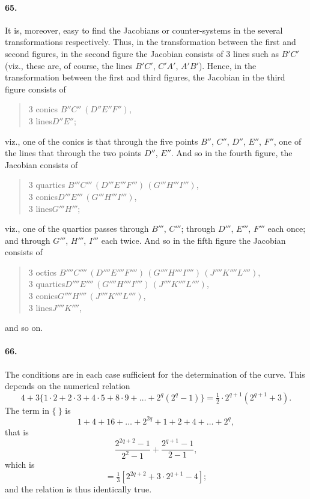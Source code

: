 \documentclass[11pt]{article}
\begin{document}
\paragraph{65.}
It is, moreover, easy to find the Jacobians or counter-systems in the
several transformations respectively. Thus, in the transformation between
the first and second figures, in the second figure the Jacobian consists
of $3$ lines such as $B'C'$ (viz., these are, of course, the lines
$B'C'$, $C'A'$, $A'B'$). Hence, in the transformation between the first
and third figures, the Jacobian in the third figure consists of
\begin{quote}
$3$ conics $B''C''\,(D''E''F'')$,\\
$3$ lines\qquad $D''E''$;
\end{quote}
viz., one of the conics is that through the five points $B''$, $C''$,
$D''$, $E''$, $F''$, one of the lines that through the two points
$D''$, $E''$. And so in the fourth figure, the Jacobian consists of
\begin{quote}
$3$ quartics $B'''C'''\,(D'''E'''F''')\,(G'''H'''I''')$,\\
$3$ conics\qquad $D'''E'''\,(G'''H'''I''')$,\\
$3$ lines\qquad\qquad $G'''H'''$;
\end{quote}
viz., one of the quartics passes through $B'''$, $C'''$; through $D'''$,
$E'''$, $F'''$ each once; and through $G'''$, $H'''$, $I'''$ each twice.
And so in the fifth figure the Jacobian consists of
\begin{quote}
$3$ octics
$B''''C''''\,(D''''E''''F'''')\,(G''''H''''I'''')\,(J''''K''''L'''')$,\\
$3$ quartics\quad $D''''E''''\,(G''''H''''I'''')\,(J''''K''''L'''')$,\\
$3$ conics\qquad $G''''H''''\,(J''''K''''L'''')$,\\
$3$ lines\qquad\qquad $J''''K''''$,
\end{quote}
and so on.

\medskip

\paragraph{66.}
The conditions are in each case sufficient for the determination of the
curve. This depends on the numerical relation
\[
4 + 3\{1\cdot 2 + 2\cdot 3 + 4\cdot 5 + 8\cdot 9 + \ldots
+ 2^{q}(2^{q}-1)\} = \tfrac{1}{2}\cdot 2^{q+1}(2^{q+1}+3).
\]
The term in $\{\ \}$ is
\[
1+4+16+\ldots+2^{2q}+1+2+4+\ldots+2^{q},
\]
that is
\[
\frac{2^{2q+2}-1}{2^{2}-1}+\frac{2^{q+1}-1}{2-1},
\]
which is
\[
=\tfrac{1}{3}[2^{2q+2}+3\cdot 2^{q+1}-4];
\]
and the relation is thus identically true.
\end{document}
